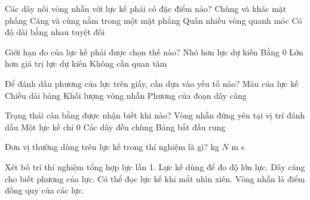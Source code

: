 \begin{ex}
Các dây nối vòng nhẫn với lực kế phải có đặc điểm nào?
\choice
{Chùng và khác mặt phẳng}
{\True Căng và cùng nằm trong một mặt phẳng}
{Quấn nhiều vòng quanh móc}
{Có độ dài bằng nhau tuyệt đối}
\end{ex}

\begin{ex}
Giới hạn đo của lực kế phải được chọn thế nào?
\choice
{Nhỏ hơn lực dự kiến}
{Bằng 0}
{\True Lớn hơn giá trị lực dự kiến}
{Không cần quan tâm}
\end{ex}

\begin{ex}
Để đánh dấu phương của lực trên giấy, cần dựa vào yếu tố nào?
\choice
{Màu của lực kế}
{Chiều dài bảng}
{Khối lượng vòng nhẫn}
{\True Phương của đoạn dây căng}
\end{ex}

\begin{ex}
Trạng thái cân bằng được nhận biết khi nào?
\choice
{\True Vòng nhẫn đứng yên tại vị trí đánh dấu}
{Một lực kế chỉ 0}
{Các dây đều chùng}
{Bảng bắt đầu rung}
\end{ex}

\begin{ex}
Đơn vị thường dùng trên lực kế trong thí nghiệm là gì?
\choice
{kg}
{\True $N$}
{m}
{s}
\end{ex}

\begin{ex}
Xét bố trí thí nghiệm tổng hợp lực lần 1.
\choiceTF
{\True Lực kế dùng để đo độ lớn lực.}
{\True Dây căng cho biết phương của lực.}
{Có thể đọc lực kế khi mắt nhìn xiên.}
{\True Vòng nhẫn là điểm đồng quy của các lực.}
\end{ex}

